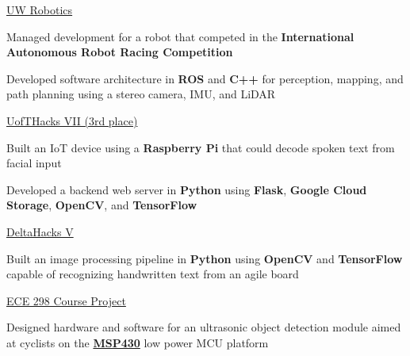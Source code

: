 \documentclass[]{awesome-cv}
\begin{document}
\begin{cventries}
	{\href{https://www.uwaterloorobotics.com}{UW Robotics}}
	{\begin{cvitems}
		\item {Managed development for a robot that competed in the \textbf{International Autonomous Robot Racing Competition}}
		\item {Developed software architecture in \textbf{ROS} and \textbf{C++} for perception, mapping, and path planning using a stereo camera, IMU, and LiDAR}
	\end{cvitems}}
	{\href{https://devpost.com/software/synviz}{UofTHacks VII (3rd place)}}
	{\begin{cvitems}
		\item {Built an IoT device using a \textbf{Raspberry Pi} that could decode spoken text from facial input}
		\item {Developed a backend web server in \textbf{Python} using \textbf{Flask}, \textbf{Google Cloud Storage}, \textbf{OpenCV}, and \textbf{TensorFlow}}
	\end{cvitems}}
	{\href{https://devpost.com/software/agilite}{DeltaHacks V}}
	{\begin{cvitems}
		\item {Built an image processing pipeline in \textbf{Python} using \textbf{OpenCV} and \textbf{TensorFlow} capable of recognizing handwritten text from an agile board}
	\end{cvitems}}
	{\href{https://uwflow.com/course/ece298}{ECE 298 Course Project}}
	{\begin{cvitems}
		\item {Designed hardware and software for an ultrasonic object detection module aimed at cyclists on the \href{https://www.ti.com/product/MSP430FR4133}{\textbf{MSP430}} low power MCU platform}
	\end{cvitems}}
\end{cventries}
\end{document}
